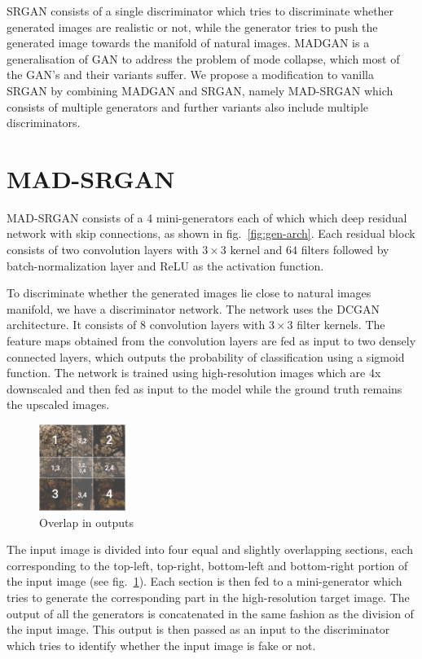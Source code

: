 \documentclass[12pt,a4paper,twocolumn]{article}
\begin{document}
        SRGAN consists of a single discriminator which tries to discriminate whether generated images are realistic or not, while the generator tries to push the generated image towards the manifold of natural images.
        MADGAN \cite{madgan} is a generalisation of GAN to address the problem of mode collapse, which most of the GAN's and their variants suffer.
        We propose a modification to vanilla SRGAN by combining MADGAN and SRGAN, namely MAD-SRGAN which consists of multiple generators and further variants also include multiple discriminators.

    \section{MAD-SRGAN}
        MAD-SRGAN consists of a 4 mini-generators each of which which deep residual network \cite{resnet} with skip connections, as shown in fig.~\ref{fig:gen-arch}.
        Each residual block consists of two convolution layers with $3\times3$ kernel and $64$ filters followed by batch-normalization \cite{batch-norm} layer and ReLU as the activation function.

        To discriminate whether the generated images lie close to natural images manifold, we have a discriminator network.
        The network uses the DCGAN \cite{dcgan} architecture.
        It consists of 8 convolution layers with $3\times3$ filter kernels.
        The feature maps obtained from the convolution layers are fed as input to two densely connected layers, which outputs the probability of classification using a sigmoid function.
        The network is trained using high-resolution images which are 4x downscaled and then fed as input to the model while the ground truth remains the upscaled images.

        \begin{figure}
            \centering
            \includegraphics[width=0.25\textwidth]{images/overlap.png}
            \caption{Overlap in outputs}
            \label{fig:overlap}
        \end{figure}

        The input image is divided into four equal and slightly overlapping sections, each corresponding to the top-left, top-right, bottom-left and bottom-right portion of the input image (see fig.~\ref{fig:overlap}).
        Each section is then fed to a mini-generator which tries to generate the corresponding part in the high-resolution target image.
        The output of all the generators is concatenated in the same fashion as the division of the input image.
        This output is then passed as an input to the discriminator which tries to identify whether the input image is fake or not.
\end{document}
